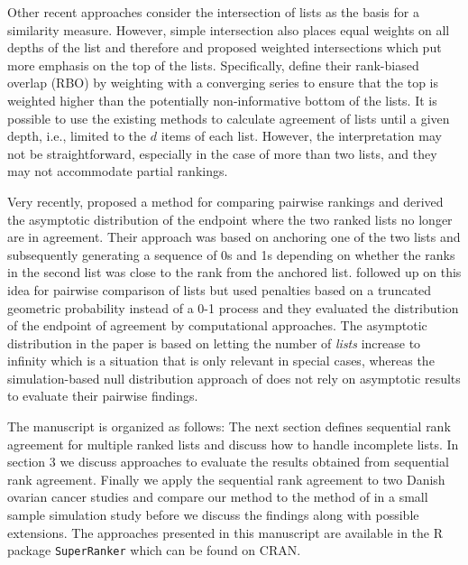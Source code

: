\documentclass[oupdraft]{bio}
\newcommand{\added}[1]{{\color{added}{}#1}}
\begin{document}
Other recent approaches consider the intersection of lists as the basis
for a similarity measure. However, simple intersection also places
equal weights on all depths of the list and therefore \citet{Fagin2003} and
\citet{Webber2010} proposed weighted intersections which put more
emphasis on the top of the lists. 
Specifically, \citet{Webber2010} define their rank-biased overlap
(RBO) by weighting with a converging series to ensure that the top is
weighted higher than the potentially non-informative bottom of the
lists.  It is possible to use the existing methods to calculate
agreement of lists until a given depth, i.e., limited to the $d$ items
of each list. However, the interpretation may not be straightforward,
especially in the case of more than two lists, and they may not
accommodate partial rankings.


Very recently, \citet{hall:schi:2012} proposed a method for comparing
pairwise rankings and derived the asymptotic distribution of the
endpoint where the two ranked lists no longer are in agreement. Their
approach was based on anchoring one of the two lists and subsequently
generating a sequence of 0s and 1s depending on whether the ranks in
the second list was close to the rank from the anchored
list. \citet{samp:verd:2013} followed up on this idea for pairwise
comparison of lists but used penalties based on a truncated geometric
probability instead of a 0-1 process and they evaluated the
distribution of the endpoint of agreement by computational approaches.
The asymptotic distribution in the \citet{hall:schi:2012} paper is
based on letting the number of \emph{lists} increase to infinity which
is a situation that is only relevant in special cases, whereas the
\added{simulation-based null distribution approach of
  \citet{samp:verd:2013} does not rely on asymptotic results to
  evaluate their pairwise findings.}



The manuscript is organized as follows: The next section defines
sequential rank agreement for multiple ranked lists and discuss how to
handle incomplete lists. In section 3 we discuss approaches to
evaluate the results obtained from sequential rank agreement. Finally
we apply the sequential rank agreement to two Danish ovarian cancer
studies and compare our method to the method of \citet{hall:schi:2012}
in a small sample simulation study before we discuss the findings
along with possible extensions. The approaches presented in this
manuscript are available in the R package \texttt{SuperRanker} which
can be found on CRAN.
\end{document}
